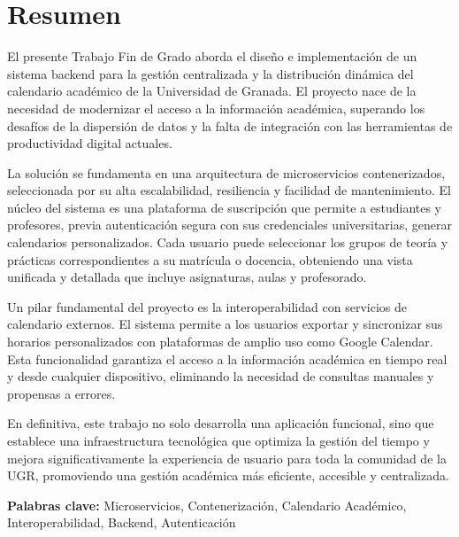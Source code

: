 \chapter*{Resumen}
El presente Trabajo Fin de Grado aborda el diseño e implementación de un sistema backend para la gestión centralizada y la distribución dinámica del calendario académico de la Universidad de Granada. El proyecto nace de la necesidad de modernizar el acceso a la información académica, superando los desafíos de la dispersión de datos y la falta de integración con las herramientas de productividad digital actuales.

La solución se fundamenta en una arquitectura de microservicios contenerizados, seleccionada por su alta escalabilidad, resiliencia y facilidad de mantenimiento. El núcleo del sistema es una plataforma de suscripción que permite a estudiantes y profesores, previa autenticación segura con sus credenciales universitarias, generar calendarios personalizados. Cada usuario puede seleccionar los grupos de teoría y prácticas correspondientes a su matrícula o docencia, obteniendo una vista unificada y detallada que incluye asignaturas, aulas y profesorado.

Un pilar fundamental del proyecto es la interoperabilidad con servicios de calendario externos. El sistema permite a los usuarios exportar y sincronizar sus horarios personalizados con plataformas de amplio uso como Google Calendar. Esta funcionalidad garantiza el acceso a la información académica en tiempo real y desde cualquier dispositivo, eliminando la necesidad de consultas manuales y propensas a errores.

En definitiva, este trabajo no solo desarrolla una aplicación funcional, sino que establece una infraestructura tecnológica que optimiza la gestión del tiempo y mejora significativamente la experiencia de usuario para toda la comunidad de la UGR, promoviendo una gestión académica más eficiente, accesible y centralizada.

\vspace{.5cm}

\textbf{Palabras clave:} Microservicios, Contenerización, Calendario Académico, Interoperabilidad, Backend, Autenticación 